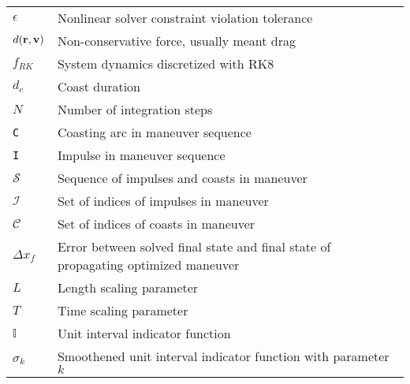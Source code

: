 \begin{longtable}{ll}
\(\epsilon\) & Nonlinear solver constraint violation tolerance \\
\(d(\mathbf{r}, \mathbf{v})\) & Non-conservative force, usually meant drag \\
\(f_{RK}\) & System dynamics discretized with RK8 \\
\(d_c\) & Coast duration \\
\(N\) & Number of integration steps \\
\texttt{C} & Coasting arc in maneuver sequence \\
\texttt{I} & Impulse in maneuver sequence \\
\(\mathcal{S}\) & Sequence of impulses and coasts in maneuver \\
\(\mathcal{I}\) & Set of indices of impulses in maneuver \\
\(\mathcal{C}\) & Set of indices of coasts in maneuver \\
\(\Delta x_f\) & Error between solved final state and final state of propagating optimized maneuver \\
\(L\) & Length scaling parameter \\
\(T\) & Time scaling parameter \\
\(\mathbb{I}\) & Unit interval indicator function \\
\(\sigma_k\) & Smoothened unit interval indicator function with parameter \(k\) \\
\end{longtable}

